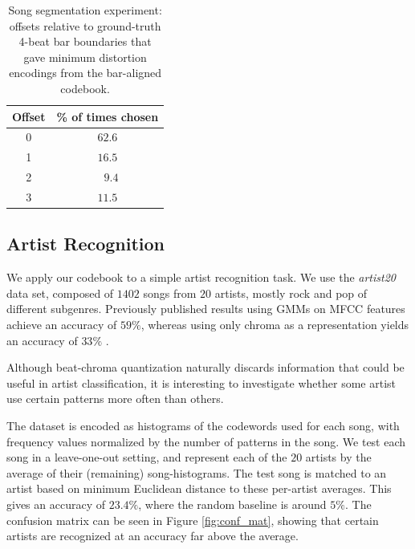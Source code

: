 \documentclass{article}
\begin{document}
\begin{table}
\begin{center}
\begin{tabular}{cc}
\toprule
Offset & \% of times chosen \\
\midrule
0 & $\mathbf{62.6}$\\
1 & $16.5$\\
2 & $\text{ }9.4$\\
3 & $11.5$\\
\bottomrule
\end{tabular}
\end{center}
\caption{\small{
Song segmentation experiment:
offsets relative to ground-truth 4-beat bar boundaries 
that gave minimum distortion encodings from the bar-aligned codebook.
}}
\label{tab:offset}
\end{table}

\subsection{Artist Recognition} \label{ssec:artist}

We apply our codebook to a simple artist recognition task.
We use the {\it artist20} data set, composed of $1402$ songs from $20$ artists, 
mostly rock and pop of different subgenres.  
Previously published results using GMMs on MFCC features achieve an 
accuracy of $59\%$, whereas using only chroma as a representation yields an
accuracy of $33\%$  \cite{Ellis2007}. 

Although beat-chroma quantization naturally discards information 
that could be useful in artist classification, it is interesting to 
investigate whether some artist use certain patterns more often than others.

The dataset is encoded as histograms of the codewords 
used for each song, with frequency values normalized by the number
of patterns in the song. We test each song in a leave-one-out setting, 
and represent each of the $20$ artists by the average of their (remaining) 
song-histograms.  The test song is matched to an artist based on 
minimum Euclidean distance to these per-artist averages.
This gives an accuracy of $23.4\%$, where the random baseline 
is around $5\%$. 
The confusion matrix can be seen in Figure \ref{fig:conf_mat}, showing 
that certain artists are recognized at an accuracy far above the average.
\end{document}
